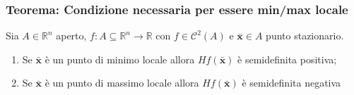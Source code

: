\documentclass[x11names]{article}
\begin{document}
	\newpage\begin{center}
		\colorbox{myred}{\begin{minipage}{5.75in}
				\begin{redes}{}
					\subsubsection{Teorema: Condizione necessaria per essere min/max locale}
					Sia \(A\in \mathbb{R}^n\) aperto, \(f:A\subseteq \mathbb{R}^n \to \mathbb{R}\) con \(f\in\mathcal{C}^2(A)\) e \(\boldsymbol{\bar{x}} \in A\) punto stazionario.
					\begin{enumerate}
						\item Se \(\boldsymbol{\bar{x}}\) è un punto di minimo locale allora \(Hf(\boldsymbol{\bar{x}})\) è semidefinita positiva;
						\item Se \(\boldsymbol{\bar{x}}\) è un punto di massimo locale allora \(Hf(\boldsymbol{\bar{x}})\) è semidefinita negativa
					\end{enumerate}
				\end{redes}
		\end{minipage}}
	\end{center}
	
\end{document}
